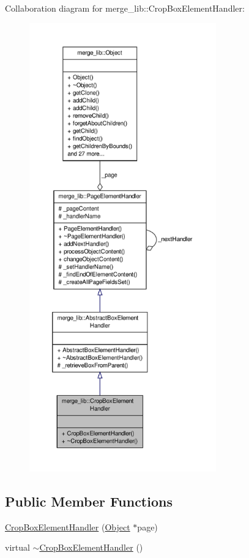 Collaboration diagram for merge\-\_\-lib\-:\-:Crop\-Box\-Element\-Handler\-:
\nopagebreak
\begin{figure}[H]
\begin{center}
\leavevmode
\includegraphics[height=550pt]{db/dbe/classmerge__lib_1_1_crop_box_element_handler__coll__graph}
\end{center}
\end{figure}
\subsection*{Public Member Functions}
\begin{DoxyCompactItemize}
\item 
\hyperlink{classmerge__lib_1_1_crop_box_element_handler_ab0405ffb622882b51305669cef8cec48}{Crop\-Box\-Element\-Handler} (\hyperlink{classmerge__lib_1_1_object}{Object} $\ast$page)
\item 
virtual \hyperlink{classmerge__lib_1_1_crop_box_element_handler_ab6a842983194647c63064a7c4a496aaa}{$\sim$\-Crop\-Box\-Element\-Handler} ()
\end{DoxyCompactItemize}
